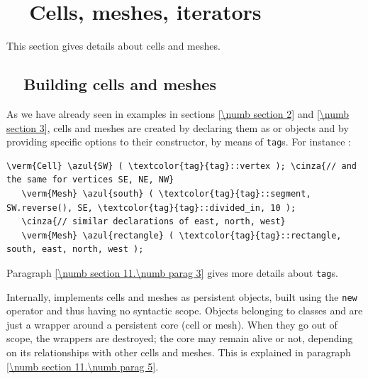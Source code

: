 
\chapter{~~Cells, meshes, iterators}\label{\numb section 9}


This section gives details about cells and meshes.

\section{~~Building cells and meshes}\label{\numb section 9.\numb parag 1}

As we have already seen in examples in sections \ref{\numb section 2} and \ref{\numb section 3},
cells and meshes are created by declaring them as {\small\tt {}} or
{\small\tt {}} objects
and by providing specific options to their constructor, by means of {\small\tt\textcolor{tag}{tag}}s.
For instance :

\begin{Verbatim}[commandchars=\\\{\},formatcom=\small\tt,
   baselinestretch=0.94,framesep=2mm                      ]
   \verm{Cell} \azul{SW} ( \textcolor{tag}{tag}::vertex ); \cinza{// and the same for vertices SE, NE, NW}
   \verm{Mesh} \azul{south} ( \textcolor{tag}{tag}::segment, SW.reverse(), SE, \textcolor{tag}{tag}::divided_in, 10 );
   \cinza{// similar declarations of east, north, west}
   \verm{Mesh} \azul{rectangle} ( \textcolor{tag}{tag}::rectangle, south, east, north, west );
\end{Verbatim}

Paragraph \ref{\numb section 11.\numb parag 3} gives more details about {\small\tt\textcolor{tag}{tag}}s.

Internally, {\maniFEM} implements cells and meshes as persistent objects, built
using the {\small\tt new} operator and thus having no syntactic scope.
Objects belonging to classes {\small\tt {}} and {\small\tt {}} are just a wrapper
around a persistent core (cell or mesh).
When they go out of scope, the wrappers are destroyed; the core may remain alive or not,
depending on its relationships with other cells and meshes.
This is explained in paragraph \ref{\numb section 11.\numb parag 5}.

